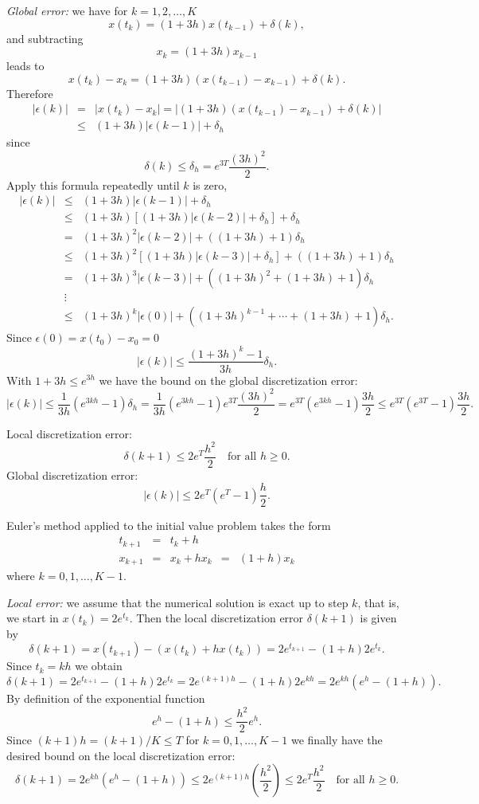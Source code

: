 \documentclass{ximera}
\begin{document}
{\em Global error:} we have for $k=1,2,\ldots,K$
\[
x(t_k)=(1+3h)x(t_{k-1})+\delta(k),
\]
and subtracting
\[
x_k = (1+3h)x_{k-1}
\]
leads to
\[
x(t_k) - x_k = (1+3h)(x(t_{k-1})-x_{k-1})+\delta(k).
\]
Therefore
\begin{eqnarray*}
|\epsilon(k)| & = & |x(t_k) - x_k| =
|(1+3h)(x(t_{k-1})-x_{k-1})+\delta(k)|\\
& \le & (1+3h)|\epsilon(k-1)|+\delta_h
\end{eqnarray*}
since
\[
\delta(k)\le \delta_h = e^{3T}\frac{(3h)^2}{2}.
\]
Apply this formula repeatedly until $k$ is zero,
\[
\begin{array}{rcl}
|\epsilon(k)|&\le&(1+3h)|\epsilon(k-1)|+\delta_h\\
&\le& (1+3h)[(1+3h)|\epsilon(k-2)|+\delta_h]+\delta_h\\
&=& (1+3h)^2|\epsilon(k-2)| + ((1+3h) + 1)\delta_h\\
&\le& (1+3h)^2[(1+3h)|\epsilon(k-3)|+\delta_h] + ((1+3h) + 1)\delta_h\\
&=& (1+3h)^3|\epsilon(k-3)| + ((1+3h)^2 + (1+3h) + 1)\delta_h\\
&\vdots& \\
&\le & (1+3h)^k|\epsilon(0)| + ((1+3h)^{k-1} +\cdots + (1+3h) + 1)\delta_h.
\end{array}
\]
Since $\epsilon(0)=x(t_0) - x_0=0$
\[
|\epsilon(k)| \le \frac{(1+3h)^k -1}{3h}\delta_h.
\]
With $1+3h\le e^{3h}$ we have the bound on the global discretization error:
\[
|\epsilon(k)| \le \frac{1}{3h} (e^{3kh}-1)\delta_h=
\frac{1}{3h}(e^{3kh}-1)e^{3T}\frac{(3h)^2}{2} =
e^{3T}(e^{3kh}-1)\frac{3h}{2}
\le e^{3T}(e^{3T}-1)\frac{3h}{2}.
\]

 \ans Local discretization error:
\[
\delta(k+1) \le
2e^{T}\frac{h^2}{2} \quad \mbox{for all $h\ge 0$.}
\]
Global discretization error:
\[
|\epsilon(k)| \le 2e^{T}(e^{T}-1)\frac{h}{2}.
\]

\soln Euler's method applied to the initial value problem takes the form
\[
\begin{array}{rclcl}
t_{k+1} & = & t_k+h & & \\
x_{k+1} & = & x_k + h x_k & = & (1+h)x_k
\end{array}
\]
where $k=0,1,\ldots,K-1$.

{\em Local error:} we assume that the
numerical solution is exact up to step $k$, that is,
we start in $x(t_k)=2e^{t_k}$.  Then the local discretization error
$\delta(k+1)$ is given by
\[
\delta(k+1) = x(t_{k+1}) - (x(t_k) + h x(t_k))=
2e^{t_{k+1}} - (1+h)2e^{t_k}.
\]
Since $t_k = kh$ we obtain
\[
\delta(k+1) = 2e^{t_{k+1}} - (1+h)2e^{t_k} =
2e^{(k+1)h} - (1+h)2e^{kh} = 2e^{kh}(e^{h}-(1+h)).
\]
By definition of the exponential function
\[
e^{h}-(1+h) \le \frac{h^2}{2}e^{h}.
\]
Since $(k+1)h=(k+1)/K\le T$ for $k=0,1,\ldots,K-1$ we finally have the
desired bound on the local discretization error:
\[
\delta(k+1) = 2e^{kh}(e^{h}-(1+h)) \le
2e^{(k+1)h}\left(\frac{h^2}{2}\right)\le
2e^{T}\frac{h^2}{2} \quad \mbox{for all $h\ge 0$.}
\]
\end{document}
